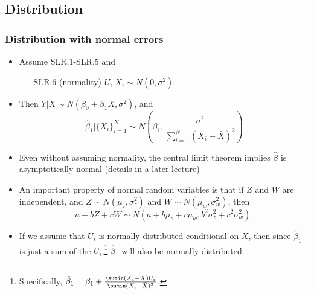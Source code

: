 \subsection{Distribution}
\begin{frame}[allowframebreaks]
  \frametitle{Distribution with normal errors}
  \begin{itemize}
  \item Assume SLR.1-SLR.5 and
    \begin{enumerate}
    \item[SLR.6] (normality) $U_i|X_i \sim N(0,\sigma^2)$
    \end{enumerate}
  \item Then $Y|X \sim N(\beta_0 + \beta_1 X, \sigma^2)$, and
    \[ \hat{\beta}_1|\{X_i\}_{i=1}^N \sim N\left(\beta_1, \frac{\sigma^2}{\sum_{i=1}^N
        (X_i - \bar{X})^2} \right) \]
  \item Even without assuming normality, the central limit theorem
    implies $\hat{\beta}$ is asymptotically normal (details in a later
    lecture)
\framebreak
  \item An important property of normal random variables is that if $Z$ and
$W$ are independent, and $Z \sim N(\mu_z, \sigma_z^2)$ and $W \sim
N(\mu_w, \sigma_w^2)$, then 
\[ a + bZ + cW \sim N(a + b \mu_z + c \mu_w, b^2 \sigma^2_z + c^2
\sigma^2_w). \]
\item  If we assume that $U_i$ is normally distributed
conditional on $X$, then since $\hat{\beta}_1$ is just a sum of the
$U_i$,\footnote{Specifically, $ \hat{\beta}_1 = \beta_1 +
  \frac{\sumin (X_i - \bar{X}) U_i}{\sumin (X_i -
    \bar{X})^2}$.}
$\hat{\beta}_1$ will also be normally distributed. 
 \end{itemize}
\end{frame}

